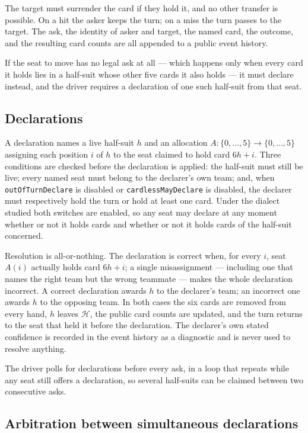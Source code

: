 The target must surrender the card if they hold it, and no other transfer is
possible. On a hit the asker keeps the turn; on a miss the turn passes to the
target. The ask, the identity of asker and target, the named card, the outcome,
and the resulting card counts are all appended to a public event history.

If the seat to move has no legal ask at all --- which happens only when every
card it holds lies in a half-suit whose other five cards it also holds --- it
must declare instead, and the driver requires a declaration of one such
half-suit from that seat.

\subsection{Declarations}
\label{app:dialect-declare}

A declaration names a live half-suit $h$ and an allocation
$A: \{0,\dots,5\} \to \{0,\dots,5\}$ assigning each position $i$ of $h$ to the
seat claimed to hold card $6h+i$. Three conditions are checked before the
declaration is applied: the half-suit must still be live; every named seat must
belong to the declarer's own team; and, when \texttt{outOfTurnDeclare} is
disabled or \texttt{cardlessMayDeclare} is disabled, the declarer must
respectively hold the turn or hold at least one card. Under the dialect studied
both switches are enabled, so any seat may declare at any moment whether or not
it holds cards and whether or not it holds cards of the half-suit concerned.

Resolution is all-or-nothing. The declaration is correct when, for every
$i$, seat $A(i)$ actually holds card $6h+i$; a single misassignment --- including
one that names the right team but the wrong teammate --- makes the whole
declaration incorrect. A correct declaration awards $h$ to the declarer's team;
an incorrect one awards $h$ to the opposing team. In both cases the six cards
are removed from every hand, $h$ leaves $\mathcal{H}$, the public card counts are
updated, and the turn returns to the seat that held it before the declaration.
The declarer's own stated confidence is recorded in the event history as a
diagnostic and is never used to resolve anything.

The driver polls for declarations before every ask, in a loop that repeats while
any seat still offers a declaration, so several half-suits can be claimed between
two consecutive asks.

\subsection{Arbitration between simultaneous declarations}
\label{app:dialect-arb}


